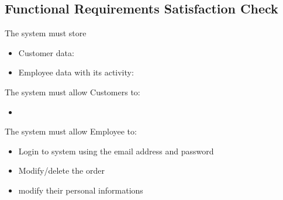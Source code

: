 \subsection{Functional Requirements Satisfaction Check}

The system must store
\begin{itemize}
	\item Customer data:
\end{itemize}
\begin{itemize}
	\item Employee data with its activity:
\end{itemize}

The system must allow Customers to:
\begin{itemize}
	\item
\end{itemize}

The system must allow Employee to:
\begin{itemize}
	\item Login to system using the email address and password
	\item Modify/delete the order
	\item modify their personal informations
\end{itemize}